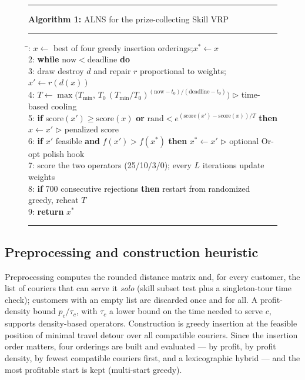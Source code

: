 \documentclass[10pt, a4paper]{article}
\begin{document}
\begin{figure}[t]
\hrule\vspace{3pt}
\noindent\textbf{Algorithm 1:} ALNS for the prize-collecting Skill VRP
\vspace{3pt}\hrule\vspace{4pt}
\small
\begin{tabbing}
\hspace{1.5em}\=\hspace{1.5em}\=\hspace{1.5em}\=:\> $x \gets$ best of four greedy insertion orderings;\quad $x^{*} \gets x$\\
2:\> \textbf{while} $\mathrm{now} < \mathrm{deadline}$ \textbf{do}\\
3:\>\> draw destroy $d$ and repair $r$ proportional to weights;\quad
        $x' \gets r(d(x))$\\
4:\>\> $T \gets \max\bigl(T_{\min},\,
        T_0\,(T_{\min}/T_0)^{(\mathrm{now}-t_0)/(\mathrm{deadline}-t_0)}\bigr)$
        \hfill$\triangleright$ time-based cooling\\
5:\>\> \textbf{if} $\mathrm{score}(x') \ge \mathrm{score}(x)$ \textbf{or}
        $\mathrm{rand} < e^{(\mathrm{score}(x')-\mathrm{score}(x))/T}$
        \textbf{then} $x \gets x'$
        \hfill$\triangleright$ penalized score\\
6:\>\> \textbf{if} $x'$ feasible \textbf{and} $f(x') > f(x^{*})$
        \textbf{then} $x^{*} \gets x'$
        \hfill$\triangleright$ optional Or-opt polish hook\\
7:\>\> score the two operators (25/10/3/0);\quad
        every $L$ iterations update weights\\
8:\>\> \textbf{if} 700 consecutive rejections \textbf{then}
        restart from randomized greedy, reheat $T$\\
9:\> \textbf{return} $x^{*}$
\end{tabbing}
\vspace{-6pt}\hrule
\end{figure}

\subsection{Preprocessing and construction heuristic}\label{sec:construction}
Preprocessing computes the rounded distance matrix and, for every customer,
the list of couriers that can serve it \emph{solo} (skill subset test plus a
singleton-tour time check); customers with an empty list are discarded once
and for all. A profit-density bound $p_c/\tau_c$, with $\tau_c$ a lower
bound on the time needed to serve $c$, supports density-based operators.
Construction is greedy insertion at the feasible position of minimal travel
detour over all compatible couriers. Since the insertion order matters, four
orderings are built and evaluated --- by profit, by profit density, by
fewest compatible couriers first, and a lexicographic hybrid --- and the most
profitable start is kept (multi-start greedy).
\end{document}
